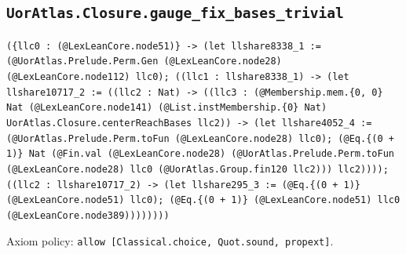 \documentclass[11pt]{article}
\begin{document}
\subsection*{\texttt{UorAtlas.Closure.gauge\_fix\_bases\_trivial}}
\noindent\texttt{(\{llc0 : (@LexLeanCore.node51)\} -> (let llshare8338\_1 := (@UorAtlas.Prelude.Perm.Gen (@LexLeanCore.node28) (@LexLeanCore.node112) llc0); ((llc1 : llshare8338\_1) -> (let llshare10717\_2 := ((llc2 : Nat) -> ((llc3 : (@Membership.mem.\{0, 0\} Nat (@LexLeanCore.node141) (@List.instMembership.\{0\} Nat) UorAtlas.Closure.centerReachBases llc2)) -> (let llshare4052\_4 := (@UorAtlas.Prelude.Perm.toFun (@LexLeanCore.node28) llc0); (@Eq.\{(0 + 1)\} Nat (@Fin.val (@LexLeanCore.node28) (@UorAtlas.Prelude.Perm.toFun (@LexLeanCore.node28) llc0 (@UorAtlas.Group.fin120 llc2))) llc2)))); ((llc2 : llshare10717\_2) -> (let llshare295\_3 := (@Eq.\{(0 + 1)\} (@LexLeanCore.node51) llc0); (@Eq.\{(0 + 1)\} (@LexLeanCore.node51) llc0 (@LexLeanCore.node389))))))))}\par
\noindent Axiom policy: \texttt{allow [Classical.choice, Quot.sound, propext]}.\par
\end{document}
